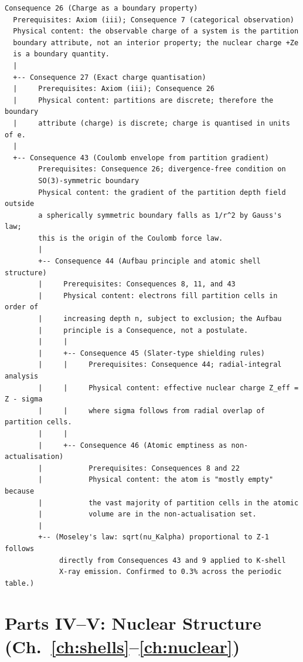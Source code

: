 \begin{center}
\begin{verbatim}
Consequence 26 (Charge as a boundary property)
  Prerequisites: Axiom (iii); Consequence 7 (categorical observation)
  Physical content: the observable charge of a system is the partition
  boundary attribute, not an interior property; the nuclear charge +Ze
  is a boundary quantity.
  |
  +-- Consequence 27 (Exact charge quantisation)
  |     Prerequisites: Axiom (iii); Consequence 26
  |     Physical content: partitions are discrete; therefore the boundary
  |     attribute (charge) is discrete; charge is quantised in units of e.
  |
  +-- Consequence 43 (Coulomb envelope from partition gradient)
        Prerequisites: Consequence 26; divergence-free condition on
        SO(3)-symmetric boundary
        Physical content: the gradient of the partition depth field outside
        a spherically symmetric boundary falls as 1/r^2 by Gauss's law;
        this is the origin of the Coulomb force law.
        |
        +-- Consequence 44 (Aufbau principle and atomic shell structure)
        |     Prerequisites: Consequences 8, 11, and 43
        |     Physical content: electrons fill partition cells in order of
        |     increasing depth n, subject to exclusion; the Aufbau
        |     principle is a Consequence, not a postulate.
        |     |
        |     +-- Consequence 45 (Slater-type shielding rules)
        |     |     Prerequisites: Consequence 44; radial-integral analysis
        |     |     Physical content: effective nuclear charge Z_eff = Z - sigma
        |     |     where sigma follows from radial overlap of partition cells.
        |     |
        |     +-- Consequence 46 (Atomic emptiness as non-actualisation)
        |           Prerequisites: Consequences 8 and 22
        |           Physical content: the atom is "mostly empty" because
        |           the vast majority of partition cells in the atomic
        |           volume are in the non-actualisation set.
        |
        +-- (Moseley's law: sqrt(nu_Kalpha) proportional to Z-1 follows
             directly from Consequences 43 and 9 applied to K-shell
             X-ray emission. Confirmed to 0.3% across the periodic table.)
\end{verbatim}
\end{center}

\section*{Parts IV--V: Nuclear Structure (Ch.~\ref{ch:shells}--\ref{ch:nuclear})}

